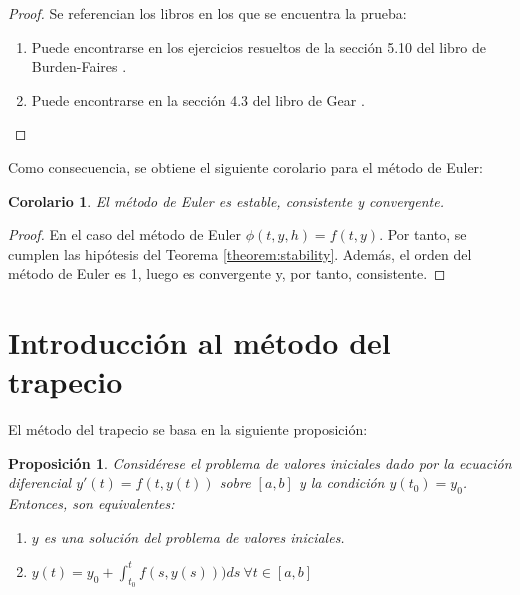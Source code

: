 \documentclass{article}
\theoremstyle{theorem-style}  %
\newtheorem{corollary}[theorem]{Corolario} %
\newtheorem{proposition}[theorem]{Proposición}
\theoremstyle{definition-style}
\theoremstyle{example-style}
\begin{document}
	\begin{proof} Se referencian los libros en los que se encuentra la prueba:
        \begin{enumerate}
            \item Puede encontrarse en los ejercicios resueltos de la sección 5.10 del libro de Burden-Faires \cite{burden}.
            \item Puede encontrarse en la sección 4.3 del libro de Gear \cite{gear}.
        \end{enumerate}
	\end{proof}

    Como consecuencia, se obtiene el siguiente corolario para el método de Euler:

    \begin{corollary}
        El método de Euler es estable, consistente y convergente.
    \end{corollary}

    \begin{proof}
        En el caso del método de Euler $\phi(t,y,h) = f(t,y)$. Por tanto, se cumplen las hipótesis del Teorema \ref{theorem:stability}. Además, el orden del método de Euler es 1, luego es convergente y, por tanto, consistente.
    \end{proof}


\section{Introducción al método del trapecio} \label{sec:intro-trapecio}

	El método del trapecio se basa en la siguiente proposición:

	\begin{proposition} \label{prop:sol-eq}
		Considérese el problema de valores iniciales dado por la ecuación diferencial $y'(t) = f(t,y(t))$ sobre $[a,b]$ y la condición $y(t_0) = y_0$.  Entonces, son equivalentes:
		\begin{enumerate}
			\item $y$ es una solución del problema de valores iniciales.
			\item $y(t) = y_0 + \int_{t_0}^{t} f(s,y(s))) ds \ \forall t \in [a,b]$
		\end{enumerate}
	\end{proposition}
\end{document}

